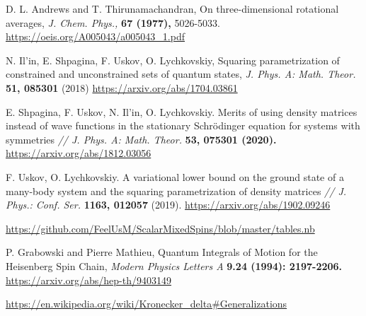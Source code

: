 \documentclass[]{article}
\renewcommand{\[}{\begin{equation}}
\renewcommand{\]}{\end{equation}}
\begin{document}
\begin{thebibliography}{3}
	D. L. Andrews and T. Thirunamachandran, On three-dimensional rotational averages, {\it J. Chem. Phys.,} {\bf 67 (1977),} 5026-5033.
	\href{https://oeis.org/A005043/a005043_1.pdf}
	{https://oeis.org/A005043/a005043\_1.pdf}
	
	 N. Il'in, E. Shpagina, F. Uskov, O. Lychkovskiy, 
	Squaring parametrization of constrained and unconstrained sets of quantum states, {\it J. Phys. A: Math. Theor.} {\bf 51, 085301} (2018)
	\href{https://arxiv.org/abs/1704.03861}{https://arxiv.org/abs/1704.03861}
	
	E. Shpagina, F. Uskov, N. Il’in, O. Lychkovskiy. Merits of using density matrices instead of wave
	functions in the stationary Schrödinger equation for systems with symmetries {\it// J. Phys. A: Math. Theor.}
	{\bf 53, 075301 (2020).}
	\href{https://arxiv.org/abs/1812.03056}{https://arxiv.org/abs/1812.03056}
	
	F. Uskov, O. Lychkovskiy. A variational lower bound on the ground state of a many-body system and
	the squaring parametrization of density matrices {\it// J. Phys.: Conf. Ser.} {\bf 1163, 012057} (2019).
	\href{https://arxiv.org/abs/1902.09246}{https://arxiv.org/abs/1902.09246}
	
	
	\href{https://github.com/FeelUsM/ScalarMixedSpins/blob/master/tables.nb}
	{https://github.com/FeelUsM/ScalarMixedSpins/blob/master/tables.nb}
	
	P. Grabowski and Pierre Mathieu, Quantum Integrals of Motion for the Heisenberg Spin Chain, {\it  Modern Physics Letters A} {\bf 9.24 (1994): 2197-2206.}
	\href{https://arxiv.org/abs/hep-th/9403149}{https://arxiv.org/abs/hep-th/9403149}
	
	\href{https://en.wikipedia.org/wiki/Kronecker_delta#Generalizations}
	{https://en.wikipedia.org/wiki/Kronecker\_delta\#Generalizations}
	
\end{thebibliography}
\end{document}
